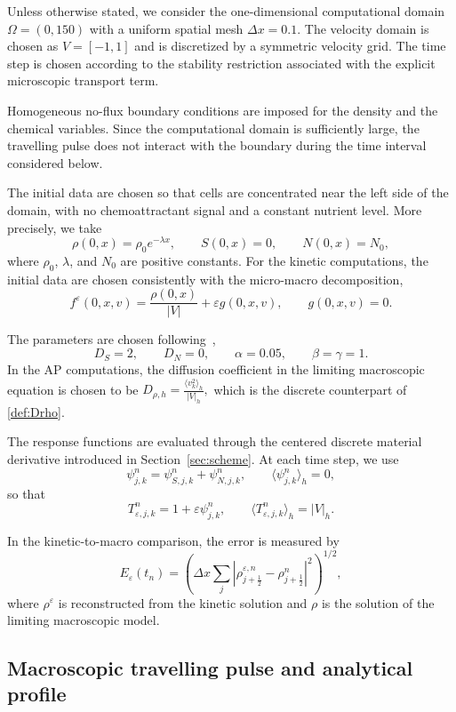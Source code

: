 \documentclass[11pt,twoside]{article}
\theoremstyle{plain}
\theoremstyle{nonumberplain}
\begin{document}
{Unless otherwise stated, we consider the one-dimensional computational
domain
\(
\Omega=(0,150)
\)
with a uniform spatial mesh \(\Delta x=0.1\). The velocity domain is
chosen as \(V=[-1,1]\) and is discretized by a symmetric velocity grid.
The time step is chosen according to the stability restriction associated
with the explicit microscopic transport term.

Homogeneous no-flux boundary conditions are imposed for the density and
the chemical variables. Since the computational domain is sufficiently
large, the travelling pulse does not interact with the boundary during the
time interval considered below.


The initial data are chosen so that cells are concentrated near the left
side of the domain, with no chemoattractant signal and a constant nutrient
level. More precisely, we take
\[
\rho(0,x)=\rho_0 e^{-\lambda x},
\qquad
S(0,x)=0,
\qquad
N(0,x)=N_0,
\]
where \(\rho_0\), \(\lambda\), and \(N_0\) are positive constants. For the
kinetic computations, the initial data are chosen consistently with the
micro-macro decomposition,
\[
f^\varepsilon(0,x,v)
=
\frac{\rho(0,x)}{|V|}
+
\varepsilon g(0,x,v),
\qquad
g(0,x,v)=0 .
\]

The parameters are chosen following~\cite{saragosti2010mathematical},
\begin{equation}\label{eq:parameter-values}
D_S=2,
\qquad
D_N=0,
\qquad
\alpha=0.05,
\qquad
\beta=\gamma=1 .
\end{equation}
In the AP computations, the diffusion coefficient in the limiting
macroscopic equation is chosen to be \(D_{\rho,h}
=
\frac{\langle v_k^2\rangle_h}{|V|_h},\) 
which is the discrete counterpart of
\eqref{def:Drho}.

The response functions are evaluated through the centered discrete
material derivative introduced in Section~\ref{sec:scheme}. At each time
step, we use
\[
\psi_{j,k}^n=\psi_{S,j,k}^n+\psi_{N,j,k}^n,
\qquad
\langle \psi_{j,k}^n\rangle_h=0,
\]
so that
\[
T_{\varepsilon,j,k}^n
=
1+\varepsilon\psi_{j,k}^n,
\qquad
\langle T_{\varepsilon,j,k}^n\rangle_h=|V|_h .
\]

In the kinetic-to-macro
comparison, the error is measured by
\[
E_\varepsilon(t_n)
=
\left(
\Delta x\sum_j
\left|
\rho_{j+\frac12}^{\varepsilon,n}
-
\rho_{j+\frac12}^{n}
\right|^2
\right)^{1/2},
\]
where \(\rho^\varepsilon\) is reconstructed from the kinetic solution and
\(\rho\) is the solution of the limiting macroscopic model.

\subsection{Macroscopic travelling pulse and analytical profile}

}
\end{document}

